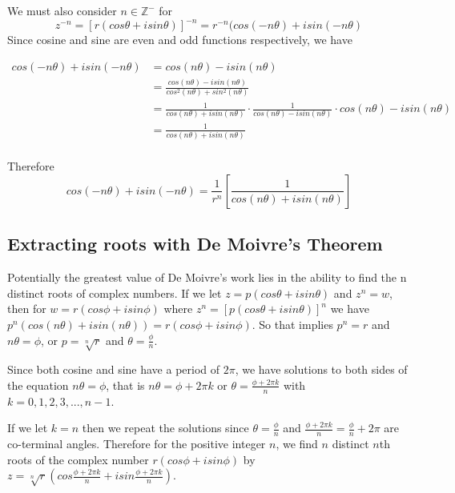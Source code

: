 \documentclass{turabian-researchpaper}
\begin{document}
We must also consider \(n \in \mathds{Z}^-\) for \[z^{-n} = \left[r(cos\theta + isin\theta)\right]^{-n} = r^{-n}(cos{(-n\theta)} + isin{(-n\theta)}\]
Since cosine and sine are even and odd functions respectively, we have 

\begin{align*}
    cos{(-n\theta)} + isin{(-n\theta)} &= cos{(n\theta)} - isin{(n\theta)}  \\ 
                                       &= \frac{cos{(n\theta)} - isin{(n\theta)}} {cos^2{(n\theta)} + sin^2{(n\theta)}} \\
                                       &= \frac{1}{cos{(n\theta)} + isin{(n\theta)}} \cdot \frac{1}{cos{(n\theta)} - isin{(n\theta)}} \cdot cos{(n\theta)} - isin{(n\theta)} \\
                                       &= \frac{1}{cos{(n\theta)} + isin{(n\theta)}} \\ 
\end{align*}

Therefore \[cos{(-n\theta)} + isin{(-n\theta)} = \frac{1}{r^n}\left[\frac{1}{cos{(n\theta)} + isin{(n\theta)}}\right]\] 

\subsection{Extracting roots with De Moivre's Theorem}\cite[p.$\Tilde{18}$]{schneider2011moivre}  

Potentially the greatest value of De Moivre's work lies in the ability to find the n distinct roots of complex numbers. If we let $z = p(cos\theta + isin\theta)$ and $z^n = w$, then for $w = r(cos\phi + isin\phi)$ where $z^n = \left[p(cos\theta + isin\theta)\right]^n$ we have $p^n(cos{(n\theta)} + isin{(n\theta)}) = r(cos\phi + isin\phi)$. So that implies $p^n = r$ and $n\theta = \phi$, or $p = \sqrt[n]{r}$ and $\theta = \frac{\phi}{n}$. 
\vspace{.1cm}

Since both cosine and sine have a period of \(2\pi\), we have solutions to both sides of the equation \(n\theta = \phi\), that is \(n\theta = \phi + {2\pi}k\) or \(\theta = \frac{\phi + {2\pi}k}{n}\) with $k = 0,1,2,3,...,n-1$. 
\vspace{.1cm}

If we let $k = n$ then we repeat the solutions since \(\theta = \frac{\phi}{n}\) and \(\frac{\phi + {2\pi}k}{n} = \frac{\phi}{n} + 2\pi\) are co-terminal angles. Therefore for the positive integer \(n\), we find \(n\) distinct \(n\)th roots of the complex number \(r(cos\phi + isin\phi)\) by $z = \sqrt[n]{r}\left(cos\frac{\phi + {2\pi}k}{n} + isin\frac{\phi + {2\pi}k}{n}\right)$. 
\vspace{.1cm}
\end{document}

